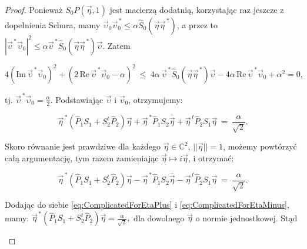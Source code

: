 {\begin{proof}
Ponieważ $S_{0} P(\vec{\eta},1)$ jest macierzą dodatnią,
korzystając raz jeszcze z dopełnienia Schura, mamy
$\vec{\upsilon}_{0} \vec{\upsilon}_{0}^{\,*} \leq  \alpha \hat{S}_{0}(\vec{\eta} \vec{\eta}^{\,*})$,
a przez to
$|\vec{\upsilon}^{\,*} \vec{\upsilon}_{0}|^{2} \leq
  \alpha \vec{\upsilon}^{\,*} \hat{S}_{0}(\vec{\eta} \vec{\eta}^{\,*}) \vec{\upsilon}$.
Zatem
\begin{linenomath*}
 \begin{equation}
4 \left( \text{Im} \, \vec{\upsilon}^{\,*} \vec{\upsilon}_{0} \right)^{2} +
\left( 2 \, \text{Re} \, \vec{\upsilon}^{\,*} \vec{\upsilon}_{0} - \alpha \right)^{2}
 \: \leq \:
4 \alpha \, \vec{\upsilon}^{\,*} \hat{S}_{0}(\vec{\eta} \vec{\eta}^{\,*}) \vec{\upsilon}
    - 4 \alpha \, \text{Re} \, \vec{\upsilon}^{\,*} \vec{\upsilon}_{0} + \alpha^{2}  = 0,
 \end{equation}
\end{linenomath*}
tj. $\vec{\upsilon}^{\,*} \vec{\upsilon}_{0} = \frac{\alpha}{2}$.
Podstawiając $\vec{\upsilon}$ i $\vec{\upsilon}_{0}$,
otrzymujemy:
\begin{linenomath*}
 \begin{equation}
\label{eq:ComplicatedForEtaPlus}
\vec{\eta}^{\,*} \left( \hat{P}_{1} S_{1} + S_{2}^{t} \hat{P}_{2} \right) \vec{\eta}
    + \vec{\eta}^{\,*} \hat{P}_{1} S_{2} \overline{\vec{\eta}}
    + \vec{\eta}^{\,t} \hat{P}_{2} S_{1} \vec{\eta} \: = \: \frac{\alpha}{\sqrt{2}}.
 \end{equation}
\end{linenomath*}
Skoro równanie jest prawdziwe dla każdego  $\vec{\eta} \in \mathbb{C}^{2}$,
$|| \vec{\eta} || = 1$,
możemy powtórzyć całą argumentację, tym razem zamieniając
$\vec{\eta} \mapsto i \vec{\eta}$,
i otrzymać:
\begin{linenomath*}
 \begin{equation}
\label{eq:ComplicatedForEtaMinus}
\vec{\eta}^{\,*} \left( \hat{P}_{1} S_{1} + S_{2}^{t} \hat{P}_{2} \right) \vec{\eta}
    - \vec{\eta}^{\,*} \hat{P}_{1} S_{2} \overline{\vec{\eta}}
    - \vec{\eta}^{\,t} \hat{P}_{2} S_{1} \vec{\eta} \: = \: \frac{\alpha}{\sqrt{2}}.
 \end{equation}
\end{linenomath*}
Dodając do siebie
\eqref{eq:ComplicatedForEtaPlus} i \eqref{eq:ComplicatedForEtaMinus},
mamy:
$
\vec{\eta}^{\,*} \left( \hat{P}_{1} S_{1} + S_{2}^{t} \hat{P}_{2} \right) \vec{\eta} =
    \frac{\alpha}{\sqrt{2}},
$
dla dowolnego $\vec{\eta}$ o normie jednostkowej.
Stąd
\begin{linenomath*}

\end{linenomath*}
\end{proof}}
